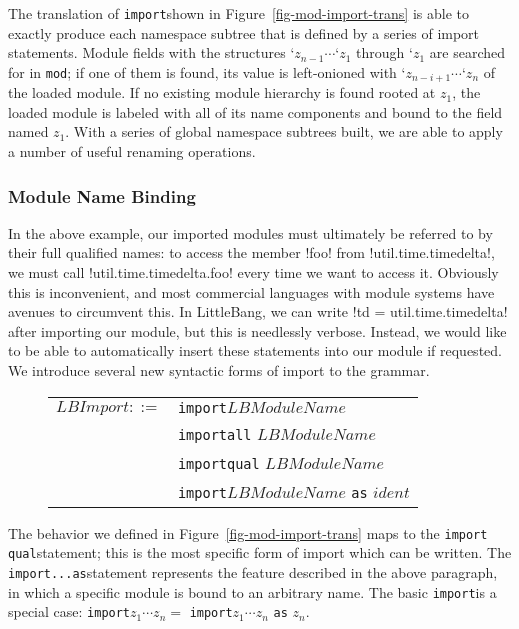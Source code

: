 \documentclass{llncs}
\newcommand{\lbimport}{\texttt{import}\;}
\newcommand{\lbimportq}{\texttt{import qual}\;}
\newcommand{\lbimporta}{\texttt{import...as}\;}
\begin{document}
\indent The translation of \lbimport shown in Figure~\ref{fig-mod-import-trans} is able to exactly produce each namespace subtree that is defined by a series of import statements. Module fields with the structures $\texttt{`}z_{n-1} \cdots \texttt{`} z_1$ through $\texttt{`} z_1$ are searched for in \texttt{mod}; if one of them is found, its value is left-onioned with $\texttt{`}z_{n-i+1} \cdots \texttt{`}z_n$ of the loaded module. If no existing module hierarchy is found rooted at $z_1$, the loaded module is labeled with all of its name components and bound to the field named $z_1$. With a series of global namespace subtrees built, we are able to apply a number of useful renaming operations.
\subsubsection{Module Name Binding}
\label{sss-mod-name-binding}
In the above example, our imported modules must ultimately be referred to by their full qualified names: to access the member \lbil!foo! from \lbil!util.time.timedelta!, we must call \lbil!util.time.timedelta.foo! every time we want to access it. Obviously this is inconvenient, and most commercial languages with module systems have avenues to circumvent this. In LittleBang, we can write \lbil!td = util.time.timedelta! after importing our module, but this is needlessly verbose. Instead, we would like to be able to automatically insert these statements into our module if requested. We introduce several new syntactic forms of import to the grammar.\\
\begin{figure}[h]
\begin{tabular}{l l @{ $|$}}
	$LBImport ::= $ & \lbimport $LBModuleName$\\
	& \lbimport \texttt{all} $LBModuleName$\\
	& \lbimport \texttt{qual} $LBModuleName$\\
	& \lbimport $LBModuleName$ \texttt{as} $ident$\\
\end{tabular}
\end{figure}
The behavior we defined in Figure~\ref{fig-mod-import-trans} maps to the \lbimportq statement; this is the most specific form of import which can be written. The \lbimporta statement represents the feature described in the above paragraph, in which a specific module is bound to an arbitrary name. The basic \lbimport is a special case: \lbimport $z_1\cdots z_n = $ \lbimport $z_1\cdots z_n$ \texttt{as} $z_n$.
\end{document}

